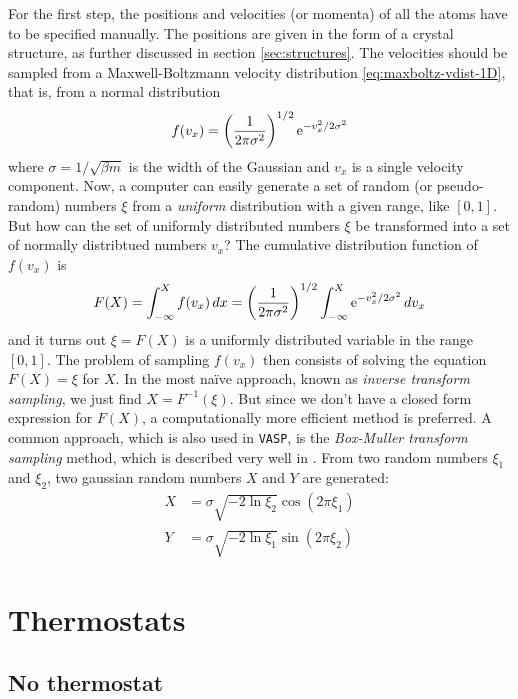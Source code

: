 \documentclass[11pt,bibliography=totoc,index=totoc]{scrbook}   %
\newcommand{\vasp}{{\texttt{VASP}}} %
\begin{document}
For the first step, the positions and velocities (or momenta) of all the atoms have to be specified manually. 
The positions are given in the form of a crystal structure, as further discussed in section \ref{sec:structures}.
The velocities should be sampled from a Maxwell-Boltzmann velocity distribution \eqref{eq:maxboltz-vdist-1D},
that is, from a normal distribution
\begin{equation}
    f(v_x) = \left(\frac{1}{2\pi\sigma^2}\right)^{1/2} \mathrm{e}^{-v_x^2/2\sigma^2}
  \label{eq:normal-dist}
\end{equation}
where $\sigma=1/\sqrt{\beta m}$ is the width of the Gaussian and $v_x$ is a single velocity component.
Now, a computer can easily generate a set of random (or pseudo-random) numbers $\xi$ from a \emph{uniform} distribution with a given range, like $[0,1]$.
But how can the set of uniformly distributed numbers $\xi$ be transformed into a set of normally distribtued numbers $v_x$?
The cumulative distribution function of $f(v_x)$ is
\begin{equation}
    F(X) = \int_{-\infty}^X f(v_x)\,dx = \left(\frac{1}{2\pi\sigma^2}\right)^{1/2} \int_{-\infty}^X \mathrm{e}^{-v_x^2/2\sigma^2} \,dv_x
    \label{eq:CDF}
\end{equation}
and it turns out $\xi = F(X)$ is a uniformly distributed variable in the range $[0,1]$. 
The problem of sampling $f(v_x)$ then consists of solving the equation $F(X)=\xi$ for $X$.
In the most naïve approach, known as \emph{inverse transform sampling}, we just find $X=F^{-1}(\xi)$.
But since we don't have a closed form expression for $F(X)$, a computationally more efficient method is preferred. 
A common approach, which is also used in \vasp, is the \emph{Box-Muller transform sampling} method, which is
described very well in \cite[101]{Tuckerman:2010}. 
From two random numbers $\xi_1$ and $\xi_2$, two gaussian random numbers $X$ and $Y$ are generated:
\begin{align}
    X &= \sigma \sqrt{-2\ln\xi_2} \cos(2\pi\xi_1) \\
    Y &= \sigma \sqrt{-2\ln\xi_1} \sin(2\pi\xi_2)
  \label{eq:box-muller-sampling}
\end{align}



\section{Thermostats}

%
\subsection{No thermostat}
%
\end{document}
